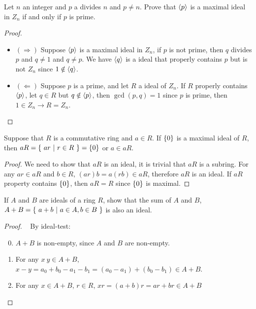 \documentclass[../main.tex]{subfiles}
\begin{document}
\setcounter{exercise}{6}
\begin{exercise}
  Let $n$ an integer and $p$ a divides $n$ and $p \neq n$.
  Prove that $\langle p \rangle$ is a maximal ideal in $Z_n$ if and only if $p$ is prime.
\end{exercise}
\begin{proof}
  ~
  \begin{itemize}
    \item $(\Rightarrow)$ Suppose $\langle p \rangle$ is a maximal ideal in $Z_n$, if $p$
      is not prime, then $q$ divides $p$ and $q \neq 1$ and $q \neq p$.
      We have $\langle q \rangle$ is a ideal that properly contains $p$ but is not $Z_n$
      since $1 \notin \langle q \rangle$.
    \item $(\Leftarrow)$ Suppose $p$ is a prime, and let $R$ a ideal of $Z_n$.
      If $R$ properly contains $\langle p \rangle$, let $q \in R$ but $q \notin \langle p \rangle$,
      then $\gcd(p, q) = 1$ since $p$ is prime, then $1 \in Z_n \rightarrow R = Z_n$.
  \end{itemize}
\end{proof}

\setcounter{exercise}{8}
\begin{exercise}
  Suppose that $R$ is a commutative ring and $a \in R$.
  If $\{0\}$ is a maximal ideal of $R$, then $aR = \{ \ ar \ | \ r \in R \ \} = \{0\}$ or $a \in aR$.
\end{exercise}
\begin{proof}
  We need to show that $aR$ is an ideal, it is trivial that $aR$ is a subring.
  For any $ar \in aR$ and $b \in R$, $(ar)b = a(rb) \in aR$, therefore $aR$ is an ideal.
  If $aR$ property contains $\{0\}$, then $aR = R$ since $\{0\}$ is maximal.
\end{proof}

\setcounter{exercise}{13}
\begin{exercise}
  If $A$ and $B$ are ideals of a ring $R$, show that the sum of $A$ and $B$,
  $A + B = \{ \ a + b \ | \ a \in A, b \in B \ \}$ is also an ideal.
\end{exercise}
\begin{proof}
  ~
  By ideal-test:
  \begin{enumerate}
    \setcounter{enumi}{-1}
    \item $A + B$ is non-empty, since $A$ and $B$ are non-empty.
    \item For any $x \ y \in A + B$, $x - y = a_0 + b_0 - a_1 - b_1 = (a_0 - a_1) + (b_0 - b_1) \in A + B$.
    \item For any $x \in A + B$, $r \in R$, $xr = (a + b)r = ar + br \in A + B$
  \end{enumerate}
\end{proof}
\end{document}
